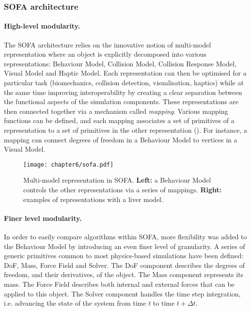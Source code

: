 \subsubsection*{SOFA architecture}

\paragraph{High-level modularity.}
The SOFA architecture relies on the innovative notion of multi-model representation where an object is explicitly decomposed into various representations: Behaviour Model, Collision Model, Collision Response Model, Visual Model and Haptic Model. Each representation can then be optimised for a particular task (biomechanics,  collision detection, visualisation, haptics) while at the same time improving interoperability by creating a clear separation between the functional aspects of the simulation components. These representations are then connected together via a mechanism called \emph{mapping}. Various mapping functions can be defined, and each mapping associates a set of primitives of a representation to a set of primitives in the other representation (). For instance, a mapping can connect degrees of freedom in a Behaviour Model to vertices in a Visual Model.

\begin{figure}
\texttt{[image: chapter6/sofa.pdf]}
\caption [Multi-model representation in SOFA] {Multi-model representation in SOFA. \textbf{Left:} a Behaviour Model controls the other representations via a series of mappings. \textbf{Right:} examples of representations with a liver model.}
\label{chap6:fig-SOFA}
\end{figure}

\paragraph{Finer level modularity.}
In order to easily compare algorithms within SOFA, more flexibility was added to the Behaviour Model by introducing an even finer level of granularity. A series of generic primitives common to most physics-based simulations have been defined: DoF, Mass, Force Field and Solver. The DoF component describes the degrees of freedom, and their derivatives, of the object. The Mass component represents its mass. The Force Field describes both internal and external forces that can be applied to this object. The Solver component handles the time step integration, i.e. advancing the state of the system from time $t$ to time $t+\Delta t$.


